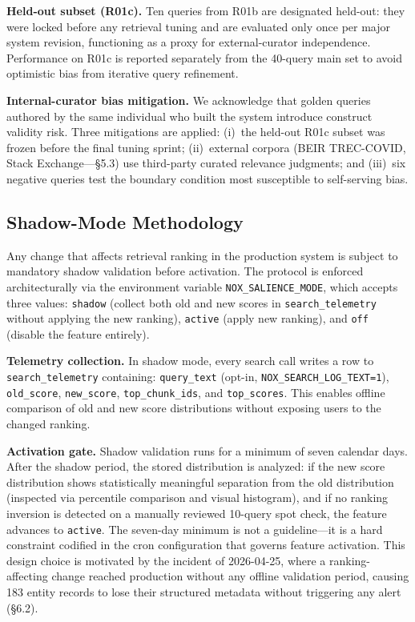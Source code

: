 \documentclass{article}
\begin{document}
\textbf{Held-out subset (R01c).} Ten queries from R01b are designated held-out: they were
locked before any retrieval tuning and are evaluated only once per major system revision,
functioning as a proxy for external-curator independence. Performance on R01c is reported
separately from the 40-query main set to avoid optimistic bias from iterative query
refinement.

\textbf{Internal-curator bias mitigation.} We acknowledge that golden queries authored by
the same individual who built the system introduce construct validity risk. Three
mitigations are applied: (i)~the held-out R01c subset was frozen before the final tuning
sprint; (ii)~external corpora (BEIR TREC-COVID, Stack Exchange---\S5.3) use third-party
curated relevance judgments; and (iii)~six negative queries test the boundary condition
most susceptible to self-serving bias.

\subsection{Shadow-Mode Methodology}

Any change that affects retrieval ranking in the production system is subject to mandatory
shadow validation before activation. The protocol is enforced architecturally via the
environment variable \texttt{NOX\_SALIENCE\_MODE}, which accepts three values:
\texttt{shadow} (collect both old and new scores in \texttt{search\_telemetry} without
applying the new ranking), \texttt{active} (apply new ranking), and \texttt{off} (disable
the feature entirely).

\textbf{Telemetry collection.} In shadow mode, every search call writes a row to
\texttt{search\_telemetry} containing: \texttt{query\_text} (opt-in,
\texttt{NOX\_SEARCH\_LOG\_TEXT=1}), \texttt{old\_score}, \texttt{new\_score},
\texttt{top\_chunk\_ids}, and \texttt{top\_scores}. This enables offline comparison of
old and new score distributions without exposing users to the changed ranking.

\textbf{Activation gate.} Shadow validation runs for a minimum of seven calendar days.
After the shadow period, the stored distribution is analyzed: if the new score distribution
shows statistically meaningful separation from the old distribution (inspected via
percentile comparison and visual histogram), and if no ranking inversion is detected on a
manually reviewed 10-query spot check, the feature advances to \texttt{active}. The
seven-day minimum is not a guideline---it is a hard constraint codified in the cron
configuration that governs feature activation. This design choice is motivated by the
incident of 2026-04-25, where a ranking-affecting change reached production without any
offline validation period, causing 183 entity records to lose their structured metadata
without triggering any alert (\S6.2).
\end{document}
